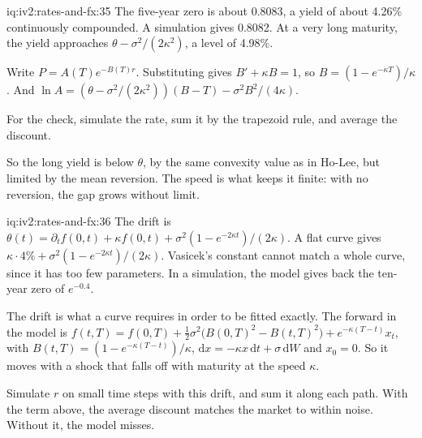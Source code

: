 \begin{solution}{iq:iv2:rates-and-fx:35}
The five-year zero is about 0.8083, a yield of about 4.26\% continuously compounded. A simulation gives 0.8082. At a very long maturity, the yield approaches $\theta - \sigma^2/(2\kappa^2)$, a level of 4.98\%.

Write $P = A(T)e^{-B(T)r}$. Substituting gives $B' + \kappa B = 1$, so $B = (1 - e^{-\kappa T})/\kappa$. And $\ln A = (\theta - \sigma^2/(2\kappa^2))(B - T) - \sigma^2B^2/(4\kappa)$.

For the check, simulate the rate, sum it by the trapezoid rule, and average the discount.

So the long yield is below $\theta$, by the same convexity value as in Ho-Lee, but limited by the mean reversion. The speed is what keeps it finite: with no reversion, the gap grows without limit.

\end{solution}

\begin{solution}{iq:iv2:rates-and-fx:36}
The drift is $\theta(t) = \partial_tf(0, t) + \kappa f(0, t) + \sigma^2(1 - e^{-2\kappa t})/(2\kappa)$. A flat curve gives $\kappa \cdot 4\% + \sigma^2(1 - e^{-2\kappa t})/(2\kappa)$. Vasicek's constant cannot match a whole curve, since it has too few parameters. In a simulation, the model gives back the ten-year zero of $e^{-0.4}$.

The drift is what a curve requires in order to be fitted exactly. The forward in the model is $f(t, T) = f(0, T) + \tfrac12\sigma^2\bigl(B(0, T)^2 - B(t, T)^2\bigr) + e^{-\kappa(T - t)}x_t$, with $B(t, T) = (1 - e^{-\kappa(T - t)})/\kappa$, $\mathrm{d}x = -\kappa x\,\mathrm{d}t + \sigma\,\mathrm{d}W$ and $x_0 = 0$. So it moves with a shock that falls off with maturity at the speed $\kappa$.

Simulate $r$ on small time steps with this drift, and sum it along each path. With the term above, the average discount matches the market to within noise. Without it, the model misses.

\end{solution}

